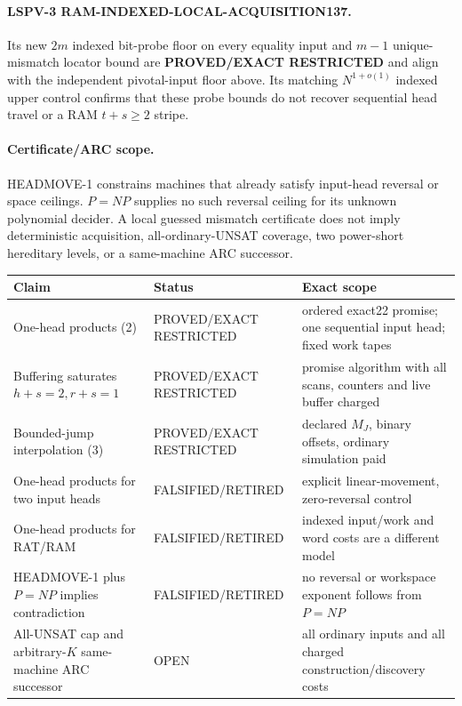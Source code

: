 \documentclass[11pt]{article}
\begin{document}
\paragraph{LSPV-3 RAM-INDEXED-LOCAL-ACQUISITION137.}
Its new \(2m\) indexed bit-probe floor on every equality input and \(m-1\) unique-mismatch locator bound are \textbf{PROVED/EXACT RESTRICTED} and align with the independent pivotal-input floor above. Its matching \(N^{1+o(1)}\) indexed upper control confirms that these probe bounds do not recover sequential head travel or a RAM \(t+s\ge2\) stripe.

\paragraph{Certificate/ARC scope.}
HEADMOVE-1 constrains machines that already satisfy input-head reversal or space ceilings. \(P=NP\) supplies no such reversal ceiling for its unknown polynomial decider. A local guessed mismatch certificate does not imply deterministic acquisition, all-ordinary-UNSAT coverage, two power-short hereditary levels, or a same-machine ARC successor.

\begin{center}\small
\begin{tabularx}{.99\linewidth}{p{.44\linewidth}p{.20\linewidth}X}\toprule
Claim & Status & Exact scope\\\midrule
One-head products (2) & PROVED/EXACT RESTRICTED & ordered exact22 promise; one sequential input head; fixed work tapes\\
Buffering saturates \(h+s=2,r+s=1\) & PROVED/EXACT RESTRICTED & promise algorithm with all scans, counters and live buffer charged\\
Bounded-jump interpolation (3) & PROVED/EXACT RESTRICTED & declared \(M_J\), binary offsets, ordinary simulation paid\\
One-head products for two input heads & FALSIFIED/RETIRED & explicit linear-movement, zero-reversal control\\
One-head products for RAT/RAM & FALSIFIED/RETIRED & indexed input/work and word costs are a different model\\
HEADMOVE-1 plus \(P=NP\) implies contradiction & FALSIFIED/RETIRED & no reversal or workspace exponent follows from \(P=NP\)\\
All-UNSAT cap and arbitrary-\(K\) same-machine ARC successor & OPEN & all ordinary inputs and all charged construction/discovery costs\\\bottomrule
\end{tabularx}
\end{center}
\end{document}
